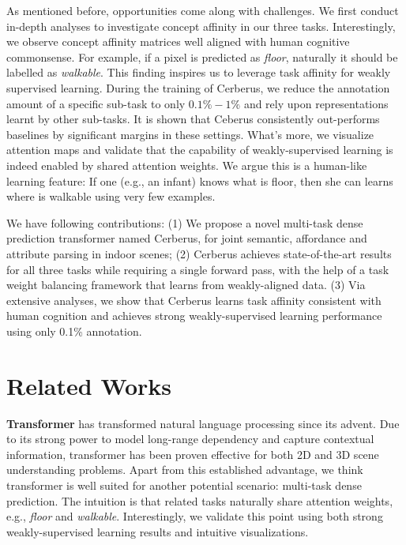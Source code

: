 \documentclass[10pt,twocolumn,letterpaper]{article}
\begin{document}
As mentioned before, opportunities come along with challenges. We first conduct in-depth analyses to investigate concept affinity in our three tasks. Interestingly, we observe concept affinity matrices well aligned with human cognitive commonsense. For example, if a pixel is predicted as \emph{floor}, naturally it should be labelled as \emph{walkable}. This finding inspires us to leverage task affinity for weakly supervised learning. During the training of Cerberus, we reduce the annotation amount of a specific sub-task to only $0.1\%-1\%$ and rely upon representations learnt by other sub-tasks. It is shown that Ceberus consistently out-performs baselines by significant margins in these settings. What's more, we visualize attention maps and validate that the capability of weakly-supervised learning is indeed enabled by shared attention weights. We argue this is a human-like learning feature: If one (e.g., an infant) knows what is floor, then she can learns where is walkable using very few examples.
  
We have following contributions: (1) We propose a novel multi-task dense prediction transformer named Cerberus, for joint semantic, affordance and attribute parsing in indoor scenes; (2) Cerberus achieves state-of-the-art results for all three tasks while requiring a single forward pass, with the help of a task weight balancing framework that learns from weakly-aligned data. (3) Via extensive analyses, we show that Cerberus learns task affinity consistent with human cognition and achieves strong weakly-supervised learning performance using only 0.1\% annotation.






\section{Related Works}

\textbf{Transformer} \cite{vaswani2017attention} has transformed natural language processing since its advent. Due to its strong power to model long-range dependency and capture contextual information, transformer has been proven effective for both 2D \cite{liu2021swin}\cite{ranftl2021vision} and 3D \cite{liu2021group}\cite{chen2022pq} scene understanding problems. Apart from this established advantage, we think transformer is well suited for another potential scenario: multi-task dense prediction. The intuition is that related tasks naturally share attention weights, e.g., \emph{floor} and \emph{walkable}. Interestingly, we validate this point using both strong weakly-supervised learning results and intuitive visualizations.
\end{document}
